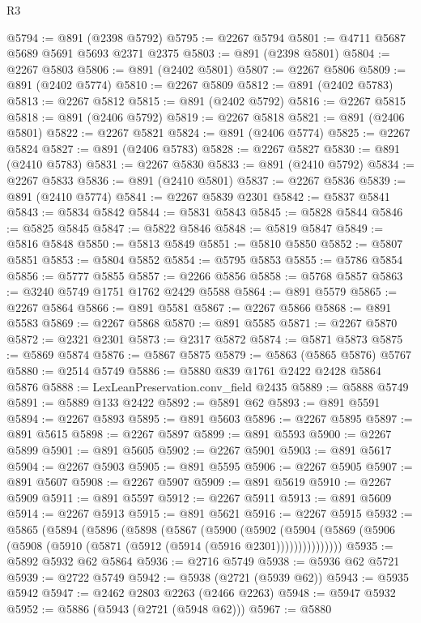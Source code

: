 \begin{lexlean}{R3}
\begin{coremodule}
@5794 := @891 (@2398 @5792)
@5795 := @2267 @5794
@5801 := @4711 @5687 @5689 @5691 @5693 @2371 @2375
@5803 := @891 (@2398 @5801)
@5804 := @2267 @5803
@5806 := @891 (@2402 @5801)
@5807 := @2267 @5806
@5809 := @891 (@2402 @5774)
@5810 := @2267 @5809
@5812 := @891 (@2402 @5783)
@5813 := @2267 @5812
@5815 := @891 (@2402 @5792)
@5816 := @2267 @5815
@5818 := @891 (@2406 @5792)
@5819 := @2267 @5818
@5821 := @891 (@2406 @5801)
@5822 := @2267 @5821
@5824 := @891 (@2406 @5774)
@5825 := @2267 @5824
@5827 := @891 (@2406 @5783)
@5828 := @2267 @5827
@5830 := @891 (@2410 @5783)
@5831 := @2267 @5830
@5833 := @891 (@2410 @5792)
@5834 := @2267 @5833
@5836 := @891 (@2410 @5801)
@5837 := @2267 @5836
@5839 := @891 (@2410 @5774)
@5841 := @2267 @5839 @2301
@5842 := @5837 @5841
@5843 := @5834 @5842
@5844 := @5831 @5843
@5845 := @5828 @5844
@5846 := @5825 @5845
@5847 := @5822 @5846
@5848 := @5819 @5847
@5849 := @5816 @5848
@5850 := @5813 @5849
@5851 := @5810 @5850
@5852 := @5807 @5851
@5853 := @5804 @5852
@5854 := @5795 @5853
@5855 := @5786 @5854
@5856 := @5777 @5855
@5857 := @2266 @5856
@5858 := @5768 @5857
@5863 := @3240 @5749 @1751 @1762 @2429 @5588
@5864 := @891 @5579
@5865 := @2267 @5864
@5866 := @891 @5581
@5867 := @2267 @5866
@5868 := @891 @5583
@5869 := @2267 @5868
@5870 := @891 @5585
@5871 := @2267 @5870
@5872 := @2321 @2301
@5873 := @2317 @5872
@5874 := @5871 @5873
@5875 := @5869 @5874
@5876 := @5867 @5875
@5879 := @5863 (@5865 @5876) @5767
@5880 := @2514 @5749
@5886 := @5880 @839 @1761 @2422 @2428 @5864 @5876
@5888 := LexLeanPreservation.conv_field @2435
@5889 := @5888 @5749
@5891 := @5889 @133 @2422
@5892 := @5891 @62
@5893 := @891 @5591
@5894 := @2267 @5893
@5895 := @891 @5603
@5896 := @2267 @5895
@5897 := @891 @5615
@5898 := @2267 @5897
@5899 := @891 @5593
@5900 := @2267 @5899
@5901 := @891 @5605
@5902 := @2267 @5901
@5903 := @891 @5617
@5904 := @2267 @5903
@5905 := @891 @5595
@5906 := @2267 @5905
@5907 := @891 @5607
@5908 := @2267 @5907
@5909 := @891 @5619
@5910 := @2267 @5909
@5911 := @891 @5597
@5912 := @2267 @5911
@5913 := @891 @5609
@5914 := @2267 @5913
@5915 := @891 @5621
@5916 := @2267 @5915
@5932 := @5865
    (@5894
      (@5896
        (@5898
          (@5867
            (@5900
              (@5902
                (@5904 (@5869 (@5906 (@5908 (@5910 (@5871 (@5912 (@5914 (@5916 @2301)))))))))))))))
@5935 := @5892 @5932 @62 @5864
@5936 := @2716 @5749
@5938 := @5936 @62 @5721
@5939 := @2722 @5749
@5942 := @5938 (@2721 (@5939 @62))
@5943 := @5935 @5942
@5947 := @2462 @2803 @2263 (@2466 @2263)
@5948 := @5947 @5932
@5952 := @5886 (@5943 (@2721 (@5948 @62)))
@5967 := @5880

\end{coremodule}
\end{lexlean}
